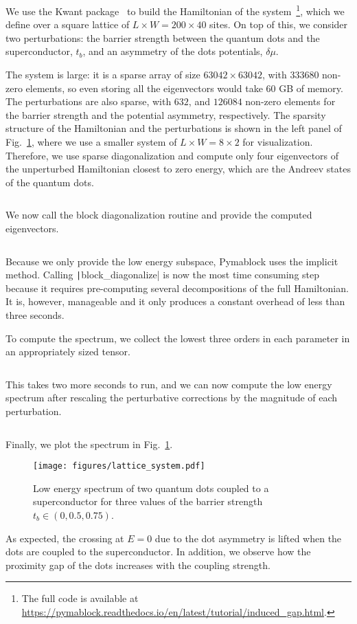 We use the Kwant package~\cite{Groth_2014} to build the Hamiltonian of the
system~\footnote{The full code is available at
\url{https://pymablock.readthedocs.io/en/latest/tutorial/induced_gap.html}.},
which we define over a square lattice of $L \times W = 200 \times 40$ sites.
On top of this, we consider two perturbations: the barrier strength between the
quantum dots and the superconductor, $t_b$, and an asymmetry of
the dots potentials, $\delta \mu$.

The system is large: it is a sparse array of size $63042 \times 63042$, with
$333680$ non-zero elements, so even storing all the eigenvectors would take
$60$ GB of memory.
The perturbations are also sparse, with $632$, and $126084$ non-zero elements
for the barrier strength and the potential asymmetry, respectively.
The sparsity structure of the Hamiltonian and the perturbations is shown in the
left panel of Fig.~\ref{fig:QD_spectrum}, where we use a smaller system of $L
\times W = 8 \times 2$ for visualization.
Therefore, we use sparse diagonalization and compute only four eigenvectors of
the unperturbed Hamiltonian closest to zero energy, which are the Andreev
states of the quantum dots.
%
\inputminted[firstline=62, lastline=63]{python}{code_figures/lattice_system.py}
%
We now call the block diagonalization routine and provide the computed
eigenvectors.
%
\inputminted[firstline=65, lastline=65]{python}{code_figures/lattice_system.py}
%
Because we only provide the low energy subspace, Pymablock uses the implicit
method.
Calling \texttt|block_diagonalize| is now the most time consuming
step because it requires pre-computing several decompositions of the full
Hamiltonian.
It is, however, manageable and it only produces a constant overhead of less
than three seconds.

To compute the spectrum, we collect the lowest three orders in each parameter
in an appropriately sized tensor.
%
\inputminted[firstline=71, lastline=71]{python}{code_figures/lattice_system.py}
%
This takes two more seconds to run, and we can now compute the low energy
spectrum after rescaling the perturbative corrections by the magnitude of each
perturbation.
%
\inputminted[firstline=74, lastline=79]{python}{code_figures/lattice_system.py}
%
Finally, we plot the spectrum in Fig.~\ref{fig:QD_spectrum}.
%
\begin{figure}[h!]
\centering
\texttt{[image: figures/lattice\_system.pdf]}
\caption{
    Low energy spectrum of two quantum dots coupled to a superconductor for
    three values of the barrier strength $t_b \in (0, 0.5, 0.75)$.
}
\label{fig:QD_spectrum}
\end{figure}
%
As expected, the crossing at $E=0$ due to the dot asymmetry is lifted when the
dots are coupled to the superconductor.
In addition, we observe how the proximity gap of the dots increases with the
coupling strength.

